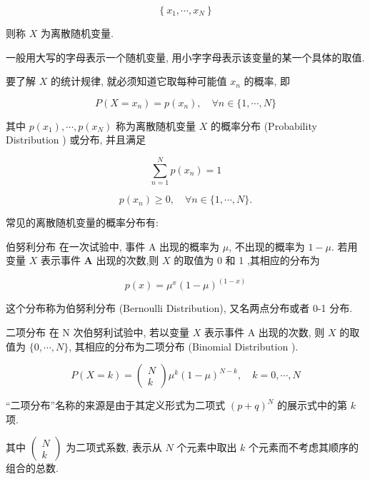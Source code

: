 \documentclass[10pt]{article}
\begin{document}
$$
\left\{x_{1}, \cdots, x_{N}\right\}
$$

则称 $X$ 为离散随机变量.

一般用大写的字母表示一个随机变量, 用小字字母表示该变量的某一个具体的取值.

要了解 $X$ 的统计规律, 就必须知道它取每种可能值 $x_{n}$ 的概率, 即


\begin{equation*}
P\left(X=x_{n}\right)=p\left(x_{n}\right), \quad \forall n \in\{1, \cdots, N\} \tag{D.4}
\end{equation*}


其中 $p\left(x_{1}\right), \cdots, p\left(x_{N}\right)$ 称为离散随机变量 $X$ 的概率分布 (Probability Distribution ) 或分布, 并且满足


\begin{equation*}
\sum_{n=1}^{N} p\left(x_{n}\right)=1 \tag{D.5}
\end{equation*}



\begin{equation*}
p\left(x_{n}\right) \geq 0, \quad \forall n \in\{1, \cdots, N\} . \tag{D.6}
\end{equation*}


常见的离散随机变量的概率分布有:

伯努利分布 在一次试验中, 事件 A 出现的概率为 $\mu$, 不出现的概率为 $1-\mu$. 若用变量 $X$ 表示事件 $\boldsymbol{A}$ 出现的次数,则 $X$ 的取值为 0 和 1 ,其相应的分布为


\begin{equation*}
p(x)=\mu^{x}(1-\mu)^{(1-x)} \tag{D.7}
\end{equation*}


这个分布称为伯努利分布 (Bernoulli Distribution), 又名两点分布或者 0-1 分布.

二项分布 在 $\mathrm{N}$ 次伯努利试验中, 若以变量 $X$ 表示事件 $\mathrm{A}$ 出现的次数, 则 $X$ 的取值为 $\{0, \cdots, N\}$, 其相应的分布为二项分布 (Binomial Distribution ).

\[
P(X=k)=\left(\begin{array}{l}
N  \tag{D.8}\\
k
\end{array}\right) \mu^{k}(1-\mu)^{N-k}, \quad k=0, \cdots, N
\]

“二项分布”名称的来源是由于其定义形式为二项式 $(p+q)^{N}$ 的展示式中的第 $k$ 项.

其中 $\left(\begin{array}{l}N \\ k\end{array}\right)$ 为二项式系数, 表示从 $N$ 个元素中取出 $k$ 个元素而不考虑其顺序的组合的总数.
\end{document}
